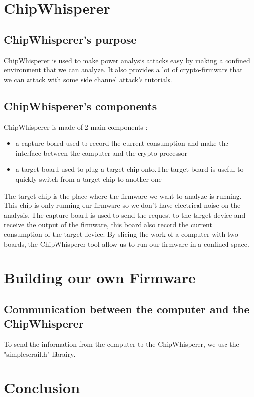 \documentclass[a4paper,12pt]{article}
\begin{document}
\newpage

\tableofcontents
\newpage


\section{ChipWhisperer}
\subsection{ChipWhisperer's purpose}
ChipWhisperer is used to make power analysis attacks easy by making a confined environment that we can analyze. It also provides a lot of crypto-firmware that we can attack with some side channel attack's tutorials.
\subsection{ChipWhisperer's components }

\noindent ChipWhisperer is made of 2 main components :
\begin{itemize}
\item{a capture board used to record the current consumption and make the interface between the computer and the crypto-processor}
\item{a target board used to plug a target chip onto.The target board is useful to quickly switch from a target chip to another one} 
\end{itemize}

The target chip is the place where the firmware we want to analyze is running. This chip is only running our firmware so we don't have electrical noise on the analysis. The capture board is used to send the request to the target device and receive the output of the firmware, this board also record the current consumption of the target device. By slicing the work of a computer with two boards, the ChipWhisperer tool allow us to run our firmware in a confined space.

\section{Building our own Firmware}
\subsection{Communication between the computer and the ChipWhisperer}
To send the information from the computer to the ChipWhisperer, we use the "simpleserail.h" librairy.


\section{Conclusion}
\end{document}
